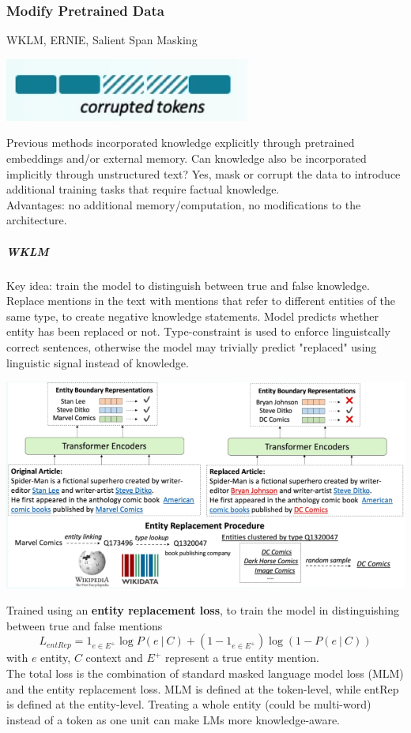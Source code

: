 \documentclass[10pt]{report}
\begin{document}
\subsubsection{Modify Pretrained Data} WKLM, ERNIE, Salient Span Masking
\begin{center}
	\includegraphics[scale=0.5]{108.png}
\end{center}
Previous methods incorporated knowledge explicitly through pretrained embeddings and/or external memory. Can knowledge also be incorporated implicitly through unstructured text? Yes, mask or corrupt the data to introduce additional training tasks that require factual knowledge.\\
Advantages: no additional memory/computation, no modifications to the architecture.
\subparagraph{WKLM} Key idea: train the model to distinguish between true and false knowledge. Replace mentions in the text with mentions that refer to different entities of the same type, to create negative knowledge statements. Model predicts whether entity has been replaced or not. Type-constraint is used to enforce linguistcally correct sentences, otherwise the model may trivially predict "replaced" using linguistic signal instead of knowledge.
\begin{center}
	\includegraphics[scale=0.5]{131.png}
\end{center}
Trained using an \textbf{entity replacement loss}, to train the model in distinguishing between true and false mentions
$$L_{entRep} = 1_{e\in E^+}\log P(e\:|\:C)+ (1-1_{e\in E^+})\log(1 - P(e\:|\:C))$$
with $e$ entity, $C$ context and $E^+$ represent a true entity mention.\\
The total loss is the combination of standard masked language model loss (MLM) and the entity replacement loss. MLM is defined at the token-level, while entRep is defined at the entity-level. Treating a whole entity (could be multi-word) instead of a token as one unit can make LMs more knowledge-aware.
\end{document}
